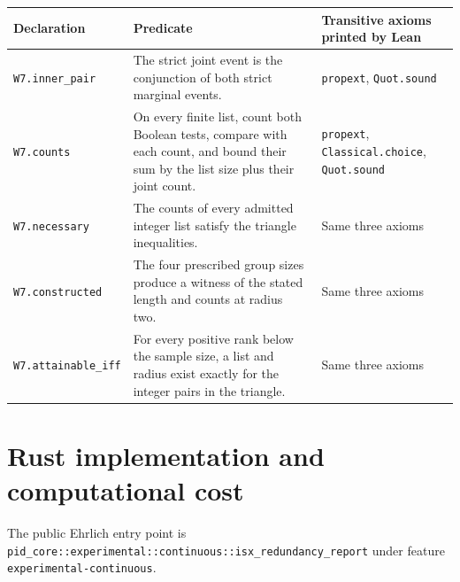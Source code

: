 {\def\LTcaptype{none} %
\begin{longtable}[]{@{}
  >{\raggedright\arraybackslash}p{}
  >{\raggedright\arraybackslash}p{}
  >{\raggedright\arraybackslash}p{}@{}}
\toprule\noalign{}
\begin{minipage}[b]{\linewidth}\raggedright
Declaration
\end{minipage} & \begin{minipage}[b]{\linewidth}\raggedright
Predicate
\end{minipage} & \begin{minipage}[b]{\linewidth}\raggedright
Transitive axioms printed by Lean
\end{minipage} \\
\midrule\noalign{}
\endhead
\bottomrule\noalign{}
\endlastfoot
\texttt{W7.inner\_pair} & The strict joint event is the conjunction of both strict marginal events. & \texttt{propext}, \texttt{Quot.sound} \\
\texttt{W7.counts} & On every finite list, count both Boolean tests, compare with each count, and bound their sum by the list size plus their joint count. & \texttt{propext}, \texttt{Classical.choice}, \texttt{Quot.sound} \\
\texttt{W7.necessary} & The counts of every admitted integer list satisfy the triangle inequalities. & Same three axioms \\
\texttt{W7.constructed} & The four prescribed group sizes produce a witness of the stated length and counts at radius two. & Same three axioms \\
\texttt{W7.attainable\_iff} & For every positive rank below the sample size, a list and radius exist exactly for the integer pairs in the triangle. & Same three axioms \\
\end{longtable}
}

\clearpage

\section{Rust implementation and computational cost}\label{rust-implementation-and-computational-cost}

The public Ehrlich entry point is \newline{}\texttt{pid\_core::experimental::continuous::isx\_redundancy\_report}\newline{} under feature \texttt{experimental-continuous}.

